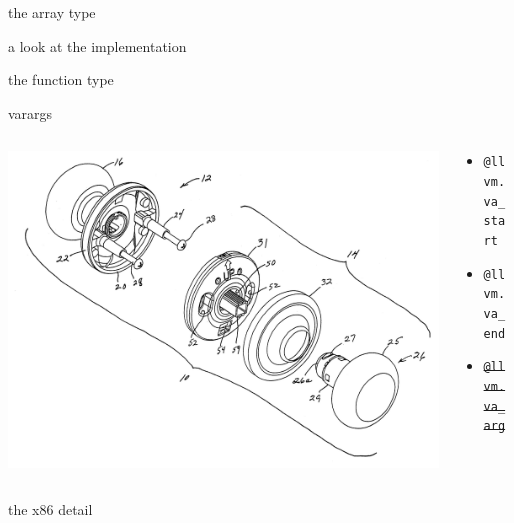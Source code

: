 \documentclass{beamer}
\begin{document}
\begin{frame}{the array type}
  
\end{frame}

\begin{frame}{a look at the implementation}
  
\end{frame}

\begin{frame}{the function type}
  
\end{frame}

\begin{frame}{varargs}
  \begin{columns}
    \begin{column}[b]{5.5cm}
      \includegraphics[scale=0.05]{variable-knob}
    \end{column}
    \begin{column}[b]{4.5cm}
      \begin{itemize}
      \item[] \texttt{@llvm.va\_start}
      \item[] \texttt{@llvm.va\_end}
      \item[] \texttt{\sout{@llvm.va\_arg}}
      \end{itemize}
    \end{column}
  \end{columns}
\end{frame}

\begin{frame}{the x86 detail}
  
  \vfill
  
\end{frame}
\end{document}
